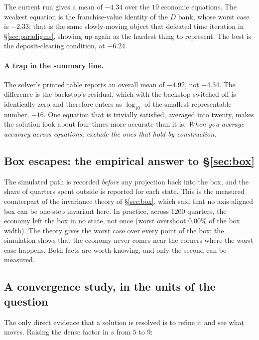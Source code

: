 \documentclass[10pt,a4paper]{article}
\theoremstyle{plain}
\theoremstyle{remark}
\begin{document}
The current run gives a mean of $-4.34$ over the $19$ economic equations. The weakest equation is the
franchise-value identity of the $D$ bank, whose worst case is $-2.33$; that is the same slowly-moving
object that defeated time iteration in \S\ref{sec:paradigms}, showing up again as the hardest thing to
represent. The best is the deposit-clearing condition, at $-6.24$.

\paragraph{A trap in the summary line.} The solver's printed table reports an overall mean of
$-4.92$, not $-4.34$. The difference is the backstop's residual, which with the backstop switched off
is identically zero and therefore enters as $\log_{10}$ of the smallest representable number, $-16$.
One equation that is trivially satisfied, averaged into twenty, makes the solution look about four
times more accurate than it is. \emph{When you average accuracy across equations, exclude the ones
that hold by construction.}

\subsection{Box escapes: the empirical answer to \S\ref{sec:box}}

The simulated path is recorded \emph{before} any projection back into the box, and the share of
quarters spent outside is reported for each state. This is the measured counterpart of the invariance
theory of \S\ref{sec:box}, which said that no axis-aligned box can be one-step invariant here. In
practice, across $1200$ quarters, the economy left the box in no state, not once (worst overshoot
$0.00\%$ of the box width). The theory gives the worst case over every point of the box; the
simulation shows that the economy never comes near the corners where the worst case happens. Both
facts are worth knowing, and only the second can be measured.

\subsection{A convergence study, in the units of the question}

The only direct evidence that a solution is resolved is to refine it and see what moves. Raising the
dense factor in $s$ from $5$ to $9$:
\end{document}
